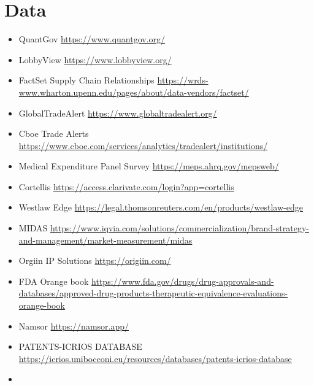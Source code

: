 \section{Data}
\begin{itemize}
    \item QuantGov \url{https://www.quantgov.org/}
    \item LobbyView \url{https://www.lobbyview.org/}
    \item FactSet Supply Chain Relationships \url{https://wrds-www.wharton.upenn.edu/pages/about/data-vendors/factset/}
    \item GlobalTradeAlert \url{https://www.globaltradealert.org/}
    \item Cboe Trade Alerts \url{https://www.cboe.com/services/analytics/tradealert/institutions/}
    \item Medical Expenditure Panel Survey \url{https://meps.ahrq.gov/mepsweb/}
    \item Cortellis \url{https://access.clarivate.com/login?app=cortellis}
    \item Westlaw Edge \url{https://legal.thomsonreuters.com/en/products/westlaw-edge}
    \item MIDAS \url{https://www.iqvia.com/solutions/commercialization/brand-strategy-and-management/market-measurement/midas}
    \item Orgiin IP Solutions \url{https://origiin.com/}
    \item FDA Orange book \url{https://www.fda.gov/drugs/drug-approvals-and-databases/approved-drug-products-therapeutic-equivalence-evaluations-orange-book}
    \item Namsor \url{https://namsor.app/}
    \item PATENTS-ICRIOS DATABASE \url{https://icrios.unibocconi.eu/resources/databases/patents-icrios-database}
    \item 
\end{itemize}


\newpage

\footnotesize



